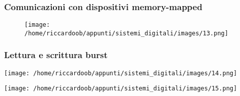 \subsubsection{Comunicazioni con dispositivi memory-mapped}
\begin{figure}[H]
    \centering
    \texttt{[image: /home/riccardoob/appunti/sistemi\_digitali/images/13.png]}
\end{figure}

\subsubsection{Lettura e scrittura \textbf{burst}}
\begin{multicols}{2}
    \begin{multicolfigure}
        \centering
        \texttt{[image: /home/riccardoob/appunti/sistemi\_digitali/images/14.png]}
    \end{multicolfigure}
    \columnbreak
    \begin{multicolfigure}
        \centering
        \texttt{[image: /home/riccardoob/appunti/sistemi\_digitali/images/15.png]}
    \end{multicolfigure}
\end{multicols}









